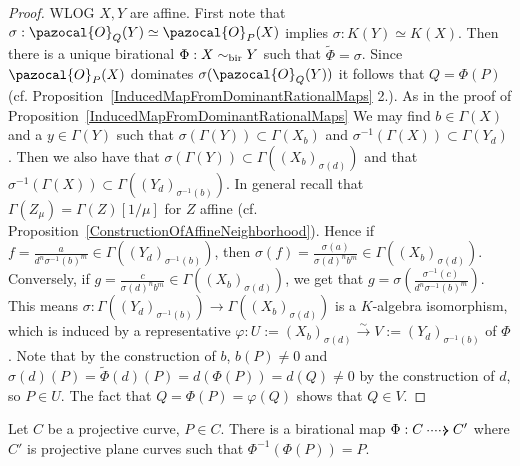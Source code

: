     \begin{proof}
        WLOG $X,Y$ are affine. First note that $\sigma:\pazocal{O}_Q(Y)\simeq \pazocal{O}_P(X)$ implies $\sigma: K(Y)\simeq K(X)$. Then there is a unique birational $\Phi : X\sim_{\mathrm{bir}} Y$ such that $\widetilde{\Phi}=\sigma$. Since $\pazocal{O}_P(X)$ dominates $\sigma(\pazocal{O}_Q(Y))$ it follows that $Q=\Phi(P)$ (cf. Proposition~\ref{InducedMapFromDominantRationalMaps} 2.). As in the proof of Proposition~\ref{InducedMapFromDominantRationalMaps} We may find $b\in \Gamma(X)$ and a $y\in \Gamma(Y)$ such that $\sigma(\Gamma(Y))\subset \Gamma(X_b)$ and $\sigma^{-1}(\Gamma(X))\subset \Gamma(Y_d)$. Then we also have that $\sigma(\Gamma(Y))\subset \Gamma((X_b)_{\sigma(d)})$ and that $\sigma^{-1}(\Gamma(X))\subset \Gamma((Y_d)_{\sigma^{-1}(b)})$. In general recall that $\Gamma(Z_\mu)=\Gamma(Z)[1/\mu]$ for $Z$ affine (cf. Proposition~\ref{ConstructionOfAffineNeighborhood}). Hence if $f=\frac{a}{d^n\sigma^{-1}(b)^m}\in \Gamma((Y_d)_{\sigma^{-1}(b)})$, then $\sigma(f)=\frac{\sigma(a)}{\sigma(d)^nb^m}\in \Gamma((X_b)_{\sigma(d)})$. Conversely, if $g=\frac{c}{\sigma(d)^nb^m}\in \Gamma((X_b)_{\sigma(d)})$, we get that $g=\sigma\left(\frac{\sigma^{-1}(c)}{d^n\sigma^{-1}(b)^m}\right).$ This means $\sigma : \Gamma((Y_d)_{\sigma^{-1}(b)})\rightarrow \Gamma((X_b)_{\sigma(d)})$ is a $K$-algebra isomorphism, which is induced by a representative $\varphi: U:=(X_b)_{\sigma(d)}\overset{\sim}{\rightarrow} V:=(Y_d)_{\sigma^{-1}(b)}$ of $\Phi$. Note that by the construction of $b$, $b(P)\neq 0$ and $\sigma(d)(P)= \widetilde{\Phi}(d)(P)=d(\Phi(P))=d(Q)\neq 0$ by the construction of $d$, so $P\in U$. The fact that $Q=\Phi(P)=\varphi(Q)$ shows that $Q\in V$. 
    \end{proof}
    \begin{proposition}
        Let $C$ be a projective curve, $P\in C$. There is a birational map $\Phi: C \dottedarrow C'$ where $C'$ is projective plane curves such that $\Phi^{-1}(\Phi(P))=P$. 
    \end{proposition}
